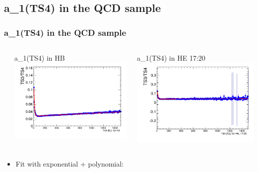 \documentclass[bigger]{beamer}
\begin{document}
\subsection{a\_1(TS4) in the QCD sample}
\label{sec-3-4}
\begin{frame}
\frametitle{a\_1(TS4) in the QCD sample}
\label{sec-3-4-1}
\begin{columns} %
\label{sec-3-4-1-1}
\begin{column}{0.55\textwidth}
\label{sec-3-4-1-1-1}

\centering
a\_1(TS4) in HB
\includegraphics[width=\textwidth]{fig/a0_ring0.png}
\end{column}
\begin{column}{0.55\textwidth}
\label{sec-3-4-1-1-2}

\centering
a\_1(TS4) in HE 17:20
\includegraphics[width=\textwidth]{fig/a0_ring1.png}
\end{column}
\end{columns}
\label{sec-3-4-1-2}
\begin{itemize}

\item Fit with exponential + polynomial:\\
\label{sec-3-4-1-2-1}%
\end{itemize} %
\end{frame}
\end{document}
